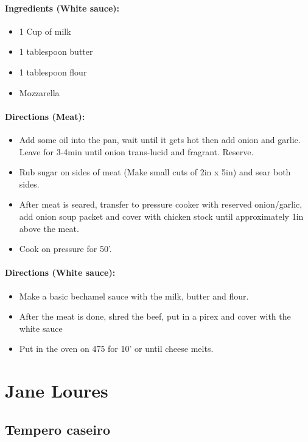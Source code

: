 \documentclass{article}
\begin{document}
\paragraph{Ingredients (White sauce):}
\begin{itemize}
    \item 1 Cup of milk
    \item 1 tablespoon butter
    \item 1 tablespoon flour
    \item Mozzarella
\end{itemize}  

\paragraph{Directions (Meat):}
\begin{itemize}
    \item Add some oil into the pan, wait until it gets hot then add onion and garlic. Leave for 3-4min until onion trans-lucid and fragrant. Reserve.
    \item Rub sugar on sides of meat (Make small cuts of 2in x 5in) and sear both sides.
    \item After meat is seared, transfer to pressure cooker with reserved onion/garlic, add onion soup packet and cover with chicken stock until approximately 1in above the meat.
    \item Cook on pressure for 50'.
\end{itemize}  

\paragraph{Directions (White sauce):}
\begin{itemize}
    \item Make a basic bechamel sauce with the milk, butter and flour.
    \item After the meat is done, shred the beef, put in a pirex and cover with the white sauce
    \item Put in the oven on 475 for 10' or until cheese melts.
\end{itemize} 

\section{Jane Loures}


\subsection{Tempero caseiro}
\end{document}
